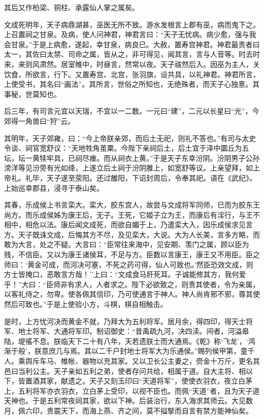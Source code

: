 \documentclass[]{article}
\begin{document}
其后又作柏梁、铜柱、承露仙人掌之属矣。

文成死明年，天子病鼎湖甚，巫医无所不致。游水发根言上郡有巫，病而鬼下之。上召置祠之甘泉。及病，使人问神君，神君言曰：``天子无忧病。病少愈，强与我会甘泉。''于是上病愈，遂起，幸甘泉，病良已。大赦，置寿宫神君。神君最贵者曰太一，其佐曰太禁、司命之属，皆从之，非可得见，闻其言，言与人音等。时去时来，来则风肃然。居室帷中，时昼言，然常以夜。天子祓然后入。因巫为主人，关饮食，所欲言，行下。又置寿宫、北宫，张羽旗，设共具，以礼神君。神君所言，上使受书，其名曰``画法''。其所言，世俗之所知也，无绝殊者，而天子心独憙。其事秘，世莫知也。

后三年，有司言元宜以天瑞，不宜以一二数。一元曰``建''，二元以长星曰``光''，今郊得一角兽曰``狩''云。

其明年，天子郊雍，曰：``今上帝朕亲郊，而后土无祀，则礼不答也。''有司与太史令谈、祠官宽舒议：``天地牲角茧粟。今陛下亲祠后土，后土宜于泽中圜丘为五坛，坛一黄犊牢具，已祠尽瘗。而从祠衣上黄。''于是天子东幸汾阴。汾阴男子公孙滂洋等见汾旁有光如绛，上遂立后土祠于汾阴脽上，如宽舒等议。上亲望拜，如上帝礼。礼毕，天子遂至荥阳。还过雒阳，下诏封周后，令奉其祀。语在《武纪》。上始巡幸郡县，浸寻于泰山矣。

其春，乐成侯上书言栾大。栾大，胶东宫人，故尝与文成将军同师，已而为胶东王尚方。而乐成侯姊为康王后，无子。王死，它姬子立为王，而康后有淫行，与王不相中，相危以法。康后闻文成死，而欲自媚于上，乃遣栾大入，因乐成侯求见言方。天子既诛文成，后悔其方不尽，及见栾大，大说。大为人长美，言多方略，而敢为大言，处之不疑。大言曰：``臣常往来海中，见安期、羡门之属，顾以臣为贱，不信臣。又以为康王诸侯耳，不足与方。臣数以言康王，康王又不用臣。臣之师曰：`黄金可成，而河决可塞，不死之药可得，仙人可致也。'然臣恐效文成，则方士皆掩口，恶敢言方哉！''上曰：``文成食马肝死耳。子诚能修其方，我何爱乎！''大曰：``臣师非有求人，人者求之。陛下必欲致之，则贵其使者，令为亲属，以客礼侍之，勿卑。使各佩其信印，乃可使通言于神人。神人尚肯邪不邪，尊其使然后可致也。''于是上使验小方，斗棋，棋自相触击。

是时，上方忧河决而黄金不就，乃拜大为五利将军。居月余，得四印，得天士将军、地士将军、大通将军印。制诏御史：``昔禹疏九河，决四渎。间者，河溢皋陆，堤徭不息。朕临天下二十有八年，天若遗朕士而大通焉。《乾》称`飞龙'，`鸿渐于般'，朕意庶几与焉。其以二千户封地士将军大为乐通侯。''赐列侯甲第，童千人。乘舆斥车马、帷帐、器物以充其家。又以卫长公主妻之，赍金十万斤，更名其邑曰当利公主。天子亲如五利之弟，使者存问共给，相属于道。自大主将、相以下，皆置酒其家，献遗之。天子又刻玉印曰``天道将军''，使使衣羽衣，夜立白茅上，五利将军亦衣羽衣，立白茅上受印，以视不臣也。而佩``天道''者，且为天子道天神也。于是五利常夜祠其家，欲以下神。后装治行，东入海求其师云。大见数月，佩六印，贵震天下，而海上燕、齐之间，莫不搤掔而自言有禁方能神仙矣。
\end{document}
